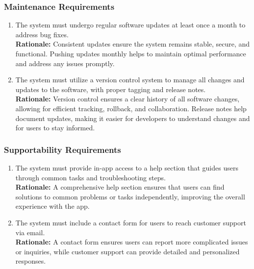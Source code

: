 \documentclass[]{article}
\begin{document}
\subsubsection{Maintenance Requirements}
\label{ssub:maintenance_requirements}
\begin{enumerate}[{MS-M}1. ]
	\item The system must undergo regular software updates at least once a month to address bug fixes.\\
	\textbf{Rationale:} Consistent updates ensure the system remains stable, secure, and functional. Pushing updates monthly helps to maintain optimal performance and address any issues promptly.
	\item The system must utilize a version control system to manage all changes and updates to the software, with proper tagging and release notes.\\
	\textbf{Rationale:} Version control ensures a clear history of all software changes, allowing for efficient tracking, rollback, and collaboration. Release notes help document updates, making it easier for developers to understand changes and for users to stay informed.
\end{enumerate}

\subsubsection{Supportability Requirements}
\label{ssub:supportability_requirements}
\begin{enumerate}[{MS-S}1. ]
	\item The system must provide in-app access to a help section that guides users through common tasks and troubleshooting steps.\\
	\textbf{Rationale:} A comprehensive help section ensures that users can find solutions to common problems or tasks independently, improving the overall experience with the app.
	\item The system must include a contact form for users to reach customer support via email.\\
	\textbf{Rationale:} A contact form ensures users can report more complicated issues or inquiries, while customer support can provide detailed and personalized responses.
\end{enumerate}
\end{document}
